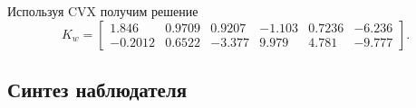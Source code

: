 Используя CVX получим решение
\begin{equation*}
    K_w=\begin{bmatrix}
        1.846 & 0.9709 & 0.9207 & -1.103 & 0.7236 & -6.236\\
        -0.2012 & 0.6522 & -3.377 & 9.979 & 4.781 & -9.777
    \end{bmatrix}.
\end{equation*}

\subsection{Синтез наблюдателя}

